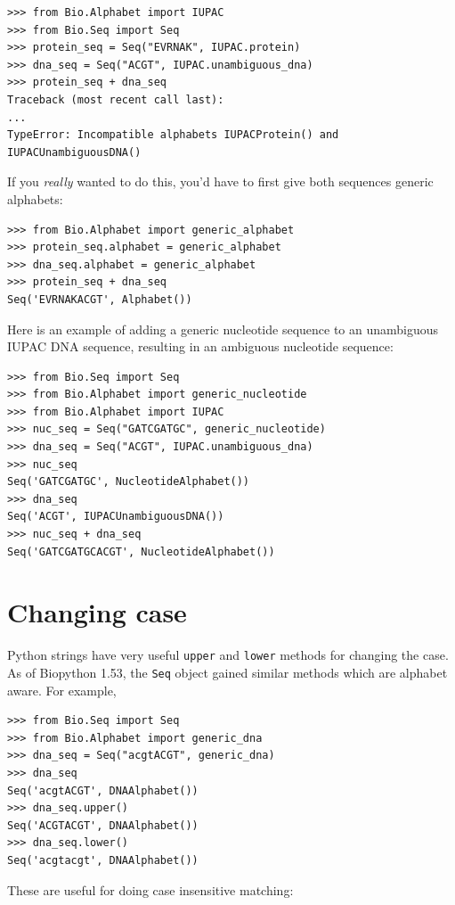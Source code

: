 \documentclass{report}
\begin{document}
\begin{verbatim}
>>> from Bio.Alphabet import IUPAC
>>> from Bio.Seq import Seq
>>> protein_seq = Seq("EVRNAK", IUPAC.protein)
>>> dna_seq = Seq("ACGT", IUPAC.unambiguous_dna)
>>> protein_seq + dna_seq
Traceback (most recent call last):
...
TypeError: Incompatible alphabets IUPACProtein() and IUPACUnambiguousDNA()
\end{verbatim}

If you \emph{really} wanted to do this, you'd have to first give both sequences generic alphabets:

\begin{verbatim}
>>> from Bio.Alphabet import generic_alphabet
>>> protein_seq.alphabet = generic_alphabet
>>> dna_seq.alphabet = generic_alphabet
>>> protein_seq + dna_seq
Seq('EVRNAKACGT', Alphabet())
\end{verbatim}

Here is an example of adding a generic nucleotide sequence to an unambiguous IUPAC DNA sequence, resulting in an ambiguous nucleotide sequence:

\begin{verbatim}
>>> from Bio.Seq import Seq
>>> from Bio.Alphabet import generic_nucleotide
>>> from Bio.Alphabet import IUPAC
>>> nuc_seq = Seq("GATCGATGC", generic_nucleotide)
>>> dna_seq = Seq("ACGT", IUPAC.unambiguous_dna)
>>> nuc_seq
Seq('GATCGATGC', NucleotideAlphabet())
>>> dna_seq
Seq('ACGT', IUPACUnambiguousDNA())
>>> nuc_seq + dna_seq
Seq('GATCGATGCACGT', NucleotideAlphabet())
\end{verbatim}

\section{Changing case}

Python strings have very useful \verb|upper| and \verb|lower| methods for changing the case.
As of Biopython 1.53, the \verb|Seq| object gained similar methods which are alphabet aware.
For example,

\begin{verbatim}
>>> from Bio.Seq import Seq
>>> from Bio.Alphabet import generic_dna
>>> dna_seq = Seq("acgtACGT", generic_dna)
>>> dna_seq
Seq('acgtACGT', DNAAlphabet())
>>> dna_seq.upper()
Seq('ACGTACGT', DNAAlphabet())
>>> dna_seq.lower()
Seq('acgtacgt', DNAAlphabet())
\end{verbatim}

These are useful for doing case insensitive matching:
\end{document}

